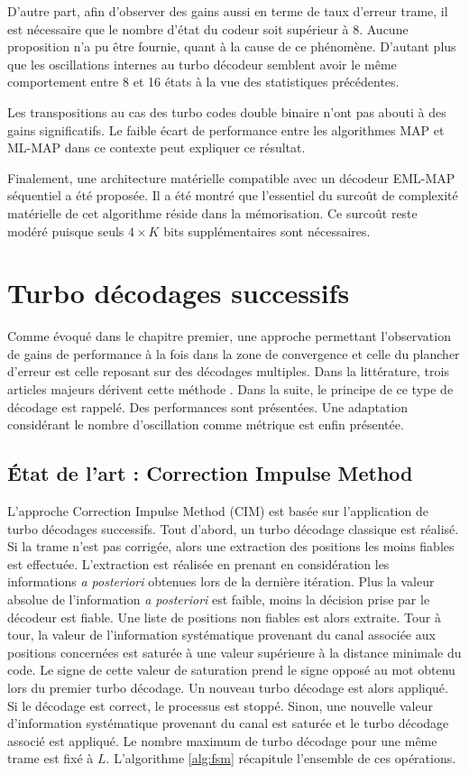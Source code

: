  D'autre part, afin d'observer des gains aussi en terme de taux d'erreur trame, il est nécessaire que le 
 nombre d'état du codeur soit supérieur à 8. Aucune proposition n'a pu être fournie, quant à la cause de ce phénomène. 
 D'autant plus que les oscillations internes au 
turbo décodeur semblent avoir le même comportement entre 8 et 16 états à la vue des statistiques précédentes. 

Les transpositions au cas des turbo codes double binaire n'ont pas abouti à des gains significatifs. Le faible écart de 
performance entre les algorithmes MAP et ML-MAP dans ce contexte peut expliquer ce résultat.

Finalement, une architecture matérielle compatible avec un décodeur EML-MAP séquentiel a été proposée. Il a été montré 
que l'essentiel du surcoût de complexité matérielle de cet algorithme réside dans la mémorisation. Ce surcoût reste modéré puisque 
seuls $4\times K$ bits supplémentaires sont nécessaires.

\section{Turbo décodages successifs}
Comme évoqué dans le chapitre premier, une approche permettant l'observation de gains de performance à la fois dans la 
zone de convergence et celle du plancher d'erreur est celle reposant sur des décodages multiples. Dans la littérature, trois 
articles majeurs dérivent cette méthode \cite{cim,fsm,pflet}. Dans la suite, le principe de ce type de décodage est rappelé. 
Des performances sont présentées. Une adaptation considérant le nombre d'oscillation comme métrique est enfin présentée.

\subsection{État de l'art : Correction Impulse Method}
L'approche Correction Impulse Method (CIM) est basée sur l'application de turbo décodages successifs. Tout d'abord, un turbo décodage 
classique est réalisé. Si la trame n'est pas corrigée, alors une extraction des positions les moins fiables est effectuée. 
L'extraction est réalisée en prenant en considération les informations \textit{a posteriori} obtenues lors de la dernière 
itération. Plus la valeur absolue de l'information \textit{a posteriori} est faible, moins la décision prise par le 
décodeur est fiable. Une liste de positions non fiables est alors extraite. Tour à tour, la valeur de l'information systématique provenant du canal 
associée aux positions concernées est saturée à une valeur supérieure à la distance minimale du code. Le signe de cette 
valeur de saturation prend le signe opposé au mot obtenu lors du premier turbo décodage. Un nouveau turbo décodage est alors
appliqué. Si le décodage est correct, le processus est stoppé. Sinon, une nouvelle valeur d'information systématique provenant du canal est saturée
et le turbo décodage associé est appliqué. Le nombre maximum de turbo décodage pour une même trame est fixé à 
$L$. L'algorithme \ref{alg:fsm} récapitule l'ensemble de ces opérations.


